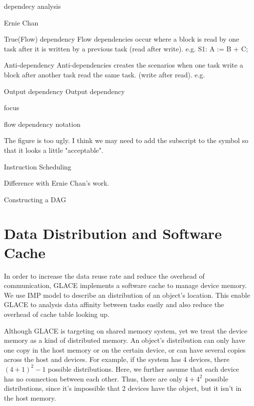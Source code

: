 \documentclass[preprint,11pt]{elsarticle}
\begin{document}


  dependecy analysis


  Ernie Chan


  True(Flow) dependency
  Flow dependencies occur where a block is read by one task after it is written by a previous task (read after write).
  e.g.
  S1: A := B + C;


  Anti-dependency
  Anti-dependencies creates the scenarios when one task write a block after another task read the same task. (write after read).
  e.g.

  Output dependency
  Output dependency 


  focus

  flow dependency notation


  The figure is too ugly. I think we may need to add the subscript to the symbol so that it looks a little "acceptable".

  Instruction Scheduling


  Difference with Ernie Chan's work.




  Constructing a DAG
 



\section{Data Distribution and Software Cache}
  In order to increase the data reuse rate and reduce the overhead of communication, GLACE
  implements a software cache to manage device memory. We use IMP model \cite{} to 
  describe an distribution of an object's location. This enable GLACE to analysis data affinity
  between tasks easily and also reduce the overhead of cache table looking up.
  
  Although GLACE is targeting on shared memory system, yet we treat the device memory
  as a kind of distributed memory. An object's distribution can only have one copy in the 
  host memory or on the certain device, or can have several copies across the host and
  devices. For example, if the system has 4 devices, there $(4+1)^2 - 1$ possible distributions.
  Here, we further assume that each device has no connection between each other. Thus,
  there are only $4 + 4^2$ possible distributions, since it's impossible that 2 devices have 
  the object, but it isn't in the host memory. 
    
\end{document}
